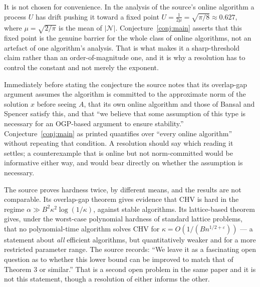 \documentclass{conjura-conjecture}
\newcommand{\eps}{\varepsilon}
\newcommand{\CHV}{\mathrm{CHV}}
\begin{document}
\begin{remark}\label{rem:constant}
It is not chosen for convenience. In the analysis of the source's online
algorithm a process $U$ has drift pushing it toward a fixed point
$U = \frac{1}{2\mu} = \sqrt{\pi/8} \approx 0.627$, where $\mu =
\sqrt{2/\pi}$ is the mean of $|\mathcal{N}|$.
Conjecture~\ref{conj:main} asserts that this fixed point is the genuine
barrier for the whole class of online algorithms, not an artefact of one
algorithm's analysis. That is what makes it a sharp-threshold claim
rather than an order-of-magnitude one, and it is why a resolution has to
control the constant and not merely the exponent.
\end{remark}

\begin{remark}\label{rem:stability}
Immediately before stating the conjecture the source notes that its
overlap-gap argument assumes the algorithm is committed to the
approximate norm of the solution $x$ before seeing $A$, that its own
online algorithm and those of Bansal and Spencer satisfy this, and that
``we believe that some assumption of this type is necessary for an
OGP-based argument to ensure stability.'' Conjecture~\ref{conj:main} as
printed quantifies over ``every online algorithm'' without repeating that
condition. A resolution should say which reading it settles; a
counterexample that is online but not norm-committed would be
informative either way, and would bear directly on whether the
assumption is necessary.
\end{remark}

\begin{remark}\label{rem:lowerbounds}
The source proves hardness twice, by different means, and the results are
not comparable. Its overlap-gap theorem gives evidence that $\CHV$ is
hard in the regime $\alpha \gg B^{2}\kappa^{2}\log(1/\kappa)$, against
stable algorithms. Its lattice-based theorem gives, under the worst-case
polynomial hardness of standard lattice problems, that no
polynomial-time algorithm solves $\CHV$ for $\kappa =
O(1/(Bn^{1/2+\eps}))$ --- a statement about \emph{all} efficient
algorithms, but quantitatively weaker and for a more restricted parameter
range. The source records: ``We leave it as a fascinating open question
as to whether this lower bound can be improved to match that of
Theorem 3 or similar.'' That is a second open problem in the same paper
and it is not this statement, though a resolution of either informs the
other.
\end{remark}
\end{document}

